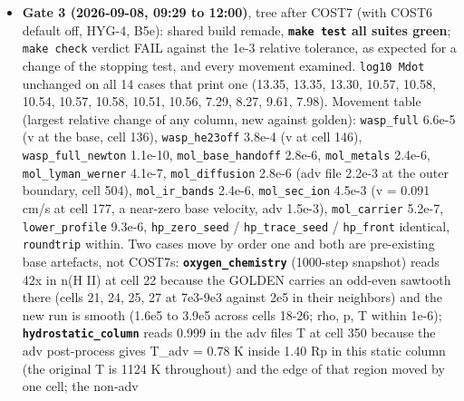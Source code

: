 \documentclass[english,a4paper]{my_memo}
\begin{document}
\begin{itemize}
  rewritten as \texttt{extrapolation\_does\_not\_cost\_passes}; the fallback-is-one-path
  row replaces the brief\textquotesingle s byte-identity row (a suite cannot hold a golden
  of the previous binary; the identity is measured in the report).
  \texttt{physics\_probe} 1491/0. Recorded, not fixed: the composition increment of
  \texttt{mol\_base\_handoff} has a floor near 5e-9 (127 of 1500 probes cannot reach
  1e-12 in 59 passes), so \texttt{csm\_comp\_tol\ =\ 1e-8} is within a factor of two
  of what that case can reach at all; COST6\textquotesingle s \texttt{n\_csm\_x\_kept} still reads 0.
  \textbf{Every golden of the matrix moves at the 1e-8 level}: gate 3 below.
\item
  \textbf{Gate 3 (2026-09-08, 09:29 to 12:00)}, tree after COST7 (with COST6
  default off, HYG-4, B5e): shared build remade, \textbf{\texttt{make\ test} all suites
  green}; \texttt{make\ check} verdict FAIL against the 1e-3 relative tolerance,
  as expected for a change of the stopping test, and every movement
  examined. \texttt{log10\ Mdot} unchanged on all 14 cases that print one (13.35,
  13.35, 13.30, 10.57, 10.58, 10.54, 10.57, 10.58, 10.51, 10.56, 7.29, 8.27,
  9.61, 7.98). Movement table (largest relative change of any column, new
  against golden): \texttt{wasp\_full} 6.6e-5 (v at the base, cell 136),
  \texttt{wasp\_he23off} 3.8e-4 (v at cell 146), \texttt{wasp\_full\_newton} 1.1e-10,
  \texttt{mol\_base\_handoff} 2.8e-6, \texttt{mol\_metals} 2.4e-6, \texttt{mol\_lyman\_werner}
  4.1e-7, \texttt{mol\_diffusion} 2.8e-6 (adv file 2.2e-3 at the outer boundary,
  cell 504), \texttt{mol\_ir\_bands} 2.4e-6, \texttt{mol\_sec\_ion} 4.5e-3 (v = 0.091 cm/s at
  cell 177, a near-zero base velocity, adv 1.5e-3), \texttt{mol\_carrier} 5.2e-7,
  \texttt{lower\_profile} 9.3e-6, \texttt{hp\_zero\_seed} / \texttt{hp\_trace\_seed} / \texttt{hp\_front}
  identical, \texttt{roundtrip} within. Two cases move by order one and both are
  pre-existing base artefacts, not COST7\textquotesingle s: \textbf{\texttt{oxygen\_chemistry}} (1000-step
  snapshot) reads 42x in n(H II) at cell 22 because the GOLDEN carries an
  odd-even sawtooth there (cells 21, 24, 25, 27 at 7e3-9e3 against 2e5 in
  their neighbors) and the new run is smooth (1.6e5 to 3.9e5 across cells
  18-26; rho, p, T within 1e-6); \textbf{\texttt{hydrostatic\_column}} reads 0.999 in the
  adv file\textquotesingle s T at cell 350 because the adv post-process gives T\_adv = 0.78 K
  inside 1.40 Rp in this static column (the original T is 1124 K
  throughout) and the edge of that region moved by one cell; the non-adv

\end{itemize}
\end{document}
